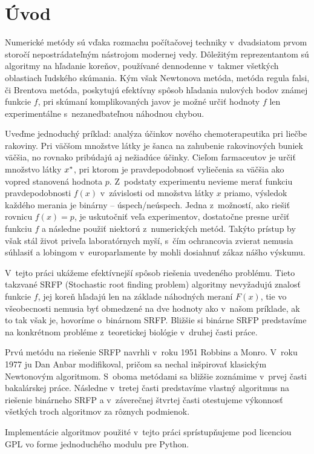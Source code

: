 \section*{Úvod}
Numerické metódy sú vďaka rozmachu počítačovej techniky v~dvadsiatom prvom
storočí nepostrádateľným nástrojom modernej vedy. Dôležitým reprezentantom sú
algoritmy na hľadanie koreňov, používané dennodenne v~takmer všetkých oblastiach
ľudského skúmania. Kým však Newtonova metóda, metóda regula falsi, či Brentova metóda,
poskytujú efektívny spôsob hľadania nulových bodov známej funkcie $f$, pri
skúmaní komplikovaných javov je možné určiť hodnoty $f$ len experimentálne
s~nezanedbateľnou náhodnou chybou.

Uveďme jednoduchý príklad: analýza účinkov nového chemoterapeutika pri
liečbe rakoviny. Pri väčšom množstve látky je šanca na zahubenie rakovinových
buniek väčšia, no rovnako pribúdajú aj nežiadúce účinky. Cieľom farmaceutov je
určiť množstvo látky $x^\ast$, pri ktorom je pravdepodobnosť vyliečenia sa väčšia ako
vopred stanovená hodnota $p$. Z~podstaty experimentu nevieme merať
funkciu pravdepodobnosti $f(x)$ v~závislosti od množstva látky $x$ priamo,
výsledok každého merania je binárny -- úspech/neúspech. Jedna z~možností, ako
riešiť rovnicu $f(x)=p$, je uskutočniť veľa experimentov, dostatočne presne
určiť funkciu $f$ a následne použiť niektorú z~numerických metód. Takýto prístup
by však stál život priveľa laboratórnych myší, s~čím ochrancovia zvierat nemusia
súhlasiť a lobingom v~europarlamente by mohli dosiahnuť zákaz nášho výskumu.

V~tejto práci ukážeme efektívnejší spôsob riešenia uvedeného problému.
Tieto takzvané SRFP (Stochastic root finding problem) algoritmy nevyžadujú
znalosť funkcie $f$, jej koreň hľadajú len na základe náhodných meraní $F(x)$,
tie vo všeobecnosti nemusia byť obmedzené na dve hodnoty ako v~našom príklade,
ak to tak však je, hovoríme o~binárnom SRFP. Bližšie si binárne SRFP predstavíme
na konkrétnom probléme z~teoretickej biológie v~druhej časti práce.

Prvú metódu na riešenie SRFP navrhli v~roku 1951 Robbins a Monro\cite{monro}.
V~roku 1977 ju Dan Anbar\cite{anbar}  modifikoval, pričom sa nechal inšpirovať
klasickým Newtonovým algoritmom. S~oboma metódami sa bližšie 
zoznámime v~prvej časti bakalárskej práce. Následne v~tretej časti predstavíme
vlastný algoritmus na riešenie binárneho SRFP a v~záverečnej štvrtej časti
otestujeme výkonnosť všetkých troch algoritmov za rôznych podmienok.

Implementácie algoritmov použité v~tejto práci sprístupňujeme pod licenciou GPL
vo forme jednoduchého modulu pre Python.

